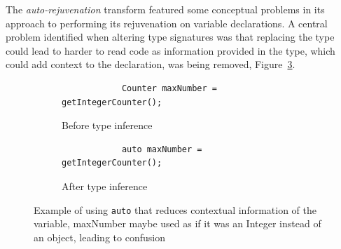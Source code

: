\documentclass[bsc,frontabs,singlespacing,twoside,parskip,deptreport]{infthesis}
\begin{document}
The \textit{auto-rejuvenation} transform featured some conceptual problems in its approach to performing its rejuvenation on variable declarations. A central problem identified when altering type signatures was that replacing the type could lead to harder to read code as information provided in the type, which could add context to the declaration, was being removed, Figure~\ref{fig:reduce-info-auto}. 

\begin{figure}[H]
    \centering
    \begin{subfigure}[h]{\textwidth}
        \centering
        \begin{verbatim}
            Counter maxNumber = getIntegerCounter();
        \end{verbatim}
        \caption{Before type inference}
        \label{fig:type-context-before}
        \vspace{0.40cm}
    \end{subfigure}
    
    \begin{subfigure}[h]{\textwidth}
        \begin{verbatim}
            auto maxNumber = getIntegerCounter();
        \end{verbatim}
        \caption{After type inference }
        \centering
        \label{fig:type-context-after}
    \end{subfigure}

    \caption{Example of using \texttt{auto} that reduces contextual information of the variable, maxNumber maybe used as if it was an Integer instead of an object, leading to confusion}
    \label{fig:reduce-info-auto}
\end{figure}

\end{document}

